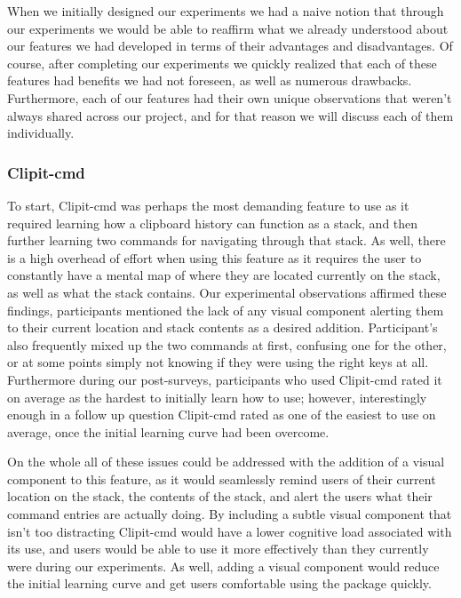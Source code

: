 \documentclass{acm_proc_article-sp}
\begin{document}
When we initially designed our experiments we had a naive notion that through our experiments we would be able to reaffirm what we already understood about our features we had developed in terms of their advantages and disadvantages. Of course, after completing our experiments we quickly realized that each of these features had benefits we had not foreseen, as well as numerous drawbacks. Furthermore, each of our features had their own unique observations that weren't always shared across our project, and for that reason we will discuss each of them individually.

\subsubsection{Clipit-cmd}

To start, Clipit-cmd was perhaps the most demanding feature to use as it required learning how a clipboard history can function as a stack, and then further learning two commands for navigating through that stack. As well, there is a high overhead of effort when using this feature as it requires the user to constantly have a mental map of where they are located currently on the stack, as well as what the stack contains. Our experimental observations affirmed these findings, participants mentioned the lack of any visual component alerting them to their current location and stack contents as a desired addition. Participant's also frequently mixed up the two commands at first, confusing one for the other, or at some points simply not knowing if they were using the right keys at all. Furthermore during our post-surveys, participants who used Clipit-cmd rated it on average as the hardest to initially learn how to use; however, interestingly enough in a follow up question Clipit-cmd rated as one of the easiest to use on average, once the initial learning curve had been overcome.

On the whole all of these issues could be addressed with the addition of a visual component to this feature, as it would seamlessly remind users of their current location on the stack, the contents of the stack, and alert the users what their command entries are actually doing. By including a subtle visual component that isn't too distracting Clipit-cmd would have a lower cognitive load associated with its use, and users would be able to use it more effectively than they currently were during our experiments. As well, adding a visual component would reduce the initial learning curve and get users comfortable using the package quickly.
\end{document}
